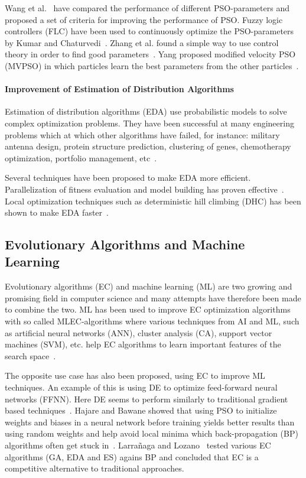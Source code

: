 Wang et al.~\cite{dang2012selection} have compared the performance of different PSO-parameters and proposed a set of criteria for improving the performance of PSO. Fuzzy logic controllers (FLC) have been used to continuously optimize the PSO-parameters by Kumar and Chaturvedi~\cite{kumar2011tuning}. Zhang et al. found a simple way to use control theory in order to find good parameters~\cite{zhang2011simple}. Yang proposed modified velocity PSO (MVPSO) in which particles learn the best parameters from the other particles~\cite{yang2011particle}.


\paragraph{Improvement of Estimation of Distribution Algorithms}

Estimation of distribution algorithms (EDA) use probabilistic models to solve complex optimization problems. They have been successful at many engineering problems which at which other algorithms have failed, for instance: military antenna design, protein structure prediction, clustering of genes, chemotherapy optimization, portfolio management, etc~\cite{Hauschild2011111}.

Several techniques have been proposed to make EDA more efficient. Parallelization of fitness evaluation and model building has proven effective~\cite{sastry2007towards}. Local optimization techniques such as deterministic hill climbing (DHC) has been shown to make EDA faster~\cite{hart1994adaptive}.

\subsection{Evolutionary Algorithms and Machine Learning}

Evolutionary algorithms (EC) and machine learning (ML) are two growing and promising field in computer science and many attempts have therefore been made to combine the two. ML has been used to improve EC optimization algorithms with so called MLEC-algorithms where various techniques from AI and ML, such as artificial neural networks (ANN), cluster analysis (CA), support vector machines (SVM), etc. help EC algorithms to learn important features of the search space~\cite{6052374}.

The opposite use case has also been proposed, using EC to improve ML techniques. An example of this is using DE to optimize feed-forward neural networks (FFNN). Here DE seems to perform similarly to traditional gradient based techniques~\cite{ilonen2003differential}. Hajare and Bawane showed that using PSO to initialize weights and biases in a neural network before training yields better results than using random weights and help avoid local minima which back-propagation (BP) algorithms often get stuck in~\cite{hajare2015feed}. Larra{\~n}aga and Lozano~\cite{larranaga2001estimation} tested various EC algorithms (GA, EDA and ES) agains BP and concluded that EC is a competitive alternative to traditional approaches.


